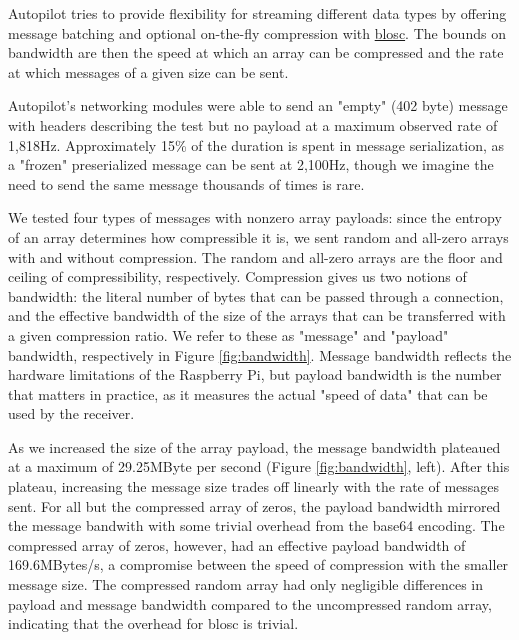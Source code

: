 Autopilot tries to provide flexibility for streaming different data types by offering message batching and optional on-the-fly compression with \href{https://www.blosc.org/}{blosc}. The bounds on bandwidth are then the speed at which an array can be compressed and the rate at which messages of a given size can be sent. 

Autopilot's networking modules were able to send an "empty" (402 byte) message with headers describing the test but no payload at a maximum observed rate of 1,818Hz. Approximately 15\% of the duration is spent in message serialization, as a "frozen" preserialized message can be sent at 2,100Hz, though we imagine the need to send the same message thousands of times is rare.

We tested four types of messages with nonzero array payloads: since the entropy of an array determines how compressible it is, we sent random and all-zero arrays with and without compression. The random and all-zero arrays are the floor and ceiling of compressibility, respectively. Compression gives us two notions of bandwidth: the literal number of bytes that can be passed through a connection, and the effective bandwidth of the size of the arrays that can be transferred with a given compression ratio. We refer to these as "message" and "payload" bandwidth, respectively in Figure \ref{fig:bandwidth}. Message bandwidth reflects the hardware limitations of the Raspberry Pi, but payload bandwidth is the number that matters in practice, as it measures the actual "speed of data" that can be used by the receiver.

As we increased the size of the array payload, the message bandwidth plateaued at a maximum of 29.25MByte per second (Figure \ref{fig:bandwidth}, left). After this plateau, increasing the message size trades off linearly with the rate of messages sent. For all but the compressed array of zeros, the payload bandwidth mirrored the message bandwith with some trivial overhead from the base64 encoding. The compressed array of zeros, however, had an effective payload bandwidth of 169.6MBytes/s, a compromise between the speed of compression with the smaller message size. The compressed random array had only negligible differences in payload and message bandwidth compared to the uncompressed random array, indicating that the overhead for blosc is trivial. 

